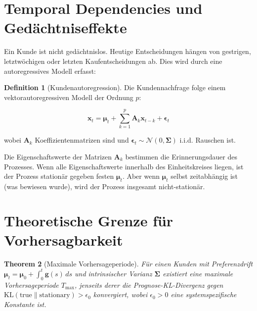 \documentclass[12pt, a4paper, titlepage]{report}
\newtheorem{theorem}{Theorem}[section]
\theoremstyle{definition}
\newtheorem{definition}[theorem]{Definition}
\theoremstyle{remark}
\newcommand{\vx}{\bm{x}}
\newcommand{\KL}{\mathrm{KL}}
\begin{document}
\section{Temporal Dependencies und Gedächtniseffekte}

Ein Kunde ist nicht gedächtnislos. Heutige Entscheidungen hängen von gestrigen, letztwöchigen oder letzten Kaufentscheidungen ab. Dies wird durch eine autoregressives Modell erfasst:

\begin{definition}[Kundenautoregression]
Die Kundennachfrage folge einem vektorautoregressiven Modell der Ordnung $p$:

\begin{equation}
\vx_t = \bm{\mu}_t + \sum_{k=1}^p \bm{A}_k \vx_{t-k} + \bm{\epsilon}_t
\label{eq:var_customer}
\end{equation}

wobei $\bm{A}_k$ Koeffizientenmatrizen sind und $\bm{\epsilon}_t \sim \mathcal{N}(0, \bm{\Sigma})$ i.i.d. Rauschen ist.
\end{definition}

Die Eigenschaftswerte der Matrizen $\bm{A}_k$ bestimmen die Erinnerungsdauer des Prozesses. Wenn alle Eigenschaftswerte innerhalb des Einheitskreises liegen, ist der Prozess stationär gegeben festen $\bm{\mu}_t$. Aber wenn $\bm{\mu}_t$ selbst zeitabhängig ist (was bewiesen wurde), wird der Prozess insgesamt nicht-stationär.

\section{Theoretische Grenze für Vorhersagbarkeit}

\begin{theorem}[Maximale Vorhersageperiode]
\label{thm:max_prediction}
Für einen Kunden mit Preferenzdrift $\bm{\mu}_t = \bm{\mu}_0 + \int_0^t \bm{g}(s) \, ds$ und intrinsischer Varianz $\bm{\Sigma}$ existiert eine maximale Vorhersageperiode $T_{\max}$, jenseits derer die Prognose-KL-Divergenz gegen $\KL(\text{true} \parallel \text{stationary}) > \epsilon_0$ konvergiert, wobei $\epsilon_0 > 0$ eine systemspezifische Konstante ist.
\end{theorem}
\end{document}
